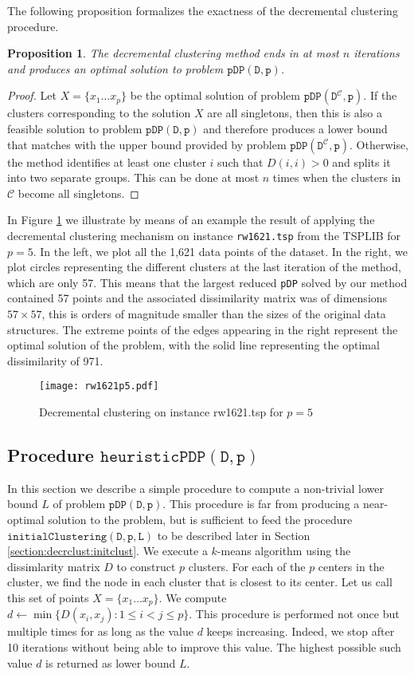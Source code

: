 \documentclass[a4paper,10pt]{article}
\newtheorem{proposition}{\sffamily Proposition}
\newcommand{\pDP}{\texttt{pDP}}
\newcommand{\pdp}[2]{$\mathtt{pDP({#1}, {#2})}$}
\newcommand{\mC}{\mathcal{C}}
\newcommand{\DmC}{D^{\mC}}
\newcommand{\hpdp}[2]{$\mathtt{heuristicPDP({#1}, {#2})}$}
\newcommand{\initclust}[3]{$\mathtt{initialClustering({#1}, {#2}, {#3})}$}
\begin{document}
The following proposition formalizes the exactness of the decremental clustering procedure.

\begin{proposition}
	The decremental clustering method ends in at most $n$ iterations and produces an optimal solution to problem \pdp{D}{p}.
\end{proposition}
\begin{proof}
	Let $X = \{x_1\ldots x_p\}$ be the optimal solution of problem \pdp{\DmC}{p}. If the clusters corresponding to the solution $X$ are all singletons, then this is also a feasible solution to problem \pdp{D}{p} and therefore produces a lower bound that matches with the upper bound provided by problem \pdp{\DmC}{p}. Otherwise, the method identifies at least one cluster $i$ such that $D(i, i) > 0$ and splits it into two separate groups. This can be done at most $n$ times when the clusters in $\mC$ become all singletons.
\end{proof}

In Figure \ref{fig:rw1621p10} we illustrate by means of an example the result of applying the decremental clustering mechanism on instance \texttt{rw1621.tsp} from the TSPLIB for $p = 5$. In the left, we plot all the 1,621 data points of the dataset. In the right, we plot circles representing the different clusters at the last iteration of the method, which are only 57. This means that the largest reduced \pDP{} solved by our method contained 57 points and the associated dissimilarity matrix was of dimensions $57\times 57$, this is orders of magnitude smaller than the sizes of the original data structures. The extreme points of the edges appearing in the right represent the optimal solution of the problem, with the solid line representing the optimal dissimilarity of 971.

\begin{figure}[!hbtp]
	\centering
	\texttt{[image: rw1621p5.pdf]}
	\caption{Decremental clustering on instance rw1621.tsp\label{fig:rw1621p10} for $p = 5$}
\end{figure}

\subsection{Procedure \hpdp{D}{p}\label{section:decrclust:hpdp}}

In this section we describe a simple procedure to compute a non-trivial lower bound $L$ of problem \pdp{D}{p}. This procedure is far from producing a near-optimal solution to the problem, but is sufficient to feed the procedure \initclust{D}{p}{L} to be described later in Section \ref{section:decrclust:initclust}. We execute a $k$-means algorithm using the dissimlarity matrix $D$ to construct $p$ clusters. For each of the $p$ centers in the cluster, we find the node in each cluster that is closest to its center. Let us call this set of points $X = \{x_1\ldots x_p\}$. We compute $d\leftarrow \min\{D(x_i, x_j): 1\leq i < j \leq p\}$. This procedure is performed not once but multiple times for as long as the value $d$ keeps increasing. Indeed, we stop after 10 iterations without being able to improve this value. The highest possible such value $d$ is returned as lower bound $L$.
\end{document}
